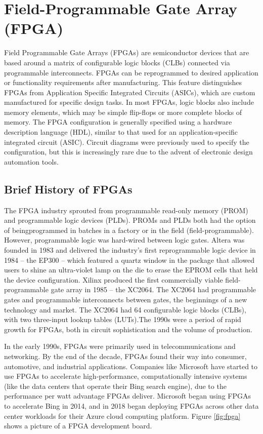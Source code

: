 \section[FPGA]{Field-Programmable Gate Array (FPGA)}
Field Programmable Gate Arrays (FPGAs) are semiconductor devices that are based around a matrix of configurable logic blocks (CLBs) connected via programmable interconnects. FPGAs can be reprogrammed to desired application or functionality requirements after manufacturing. This feature distinguishes FPGAs from Application Specific Integrated Circuits (ASICs), which are custom manufactured for specific design tasks. In most FPGAs, logic blocks also include memory elements, which may be simple flip-flops or more complete blocks of memory.  The FPGA configuration is generally specified using a hardware description language (HDL), similar to that used for an application-specific integrated circuit (ASIC). Circuit diagrams were previously used to specify the configuration, but this is increasingly rare due to the advent of electronic design automation tools.
\subsection{Brief History of FPGAs}
The FPGA industry sprouted from programmable read-only memory (PROM) and
programmable logic devices (PLDs). PROMs and PLDs both had the option of beingprogrammed in batches in a factory or in the field (field-programmable). However, programmable logic was hard-wired between logic gates. Altera was founded in 1983 and delivered the industry's first reprogrammable logic device in 1984 – the EP300 – which
featured a quartz window in the package that allowed users to shine an ultra-violet lamp on
the die to erase the EPROM cells that held the device configuration.
Xilinx produced the first commercially viable field-programmable gate array in 1985 – the
XC2064. The XC2064 had programmable gates and programmable interconnects between
gates, the beginnings of a new technology and market. The XC2064 had 64 configurable logic
blocks (CLBs), with two three-input lookup tables (LUTs).The 1990s were a period of rapid
growth for FPGAs, both in circuit sophistication and the volume of production.

In the early 1990s, FPGAs were primarily used in telecommunications and networking. By the end of the
decade, FPGAs found their way into consumer, automotive, and industrial applications.
Companies like Microsoft have started to use FPGAs to accelerate high-performance,
computationally intensive systems (like the data centers that operate their Bing search engine),
due to the performance per watt advantage FPGAs deliver. Microsoft began using FPGAs to
accelerate Bing in 2014, and in 2018 began deploying FPGAs across other data center
workloads for their Azure cloud computing platform. Figure \ref{fig:fpga} shows a picture of a FPGA development board.


